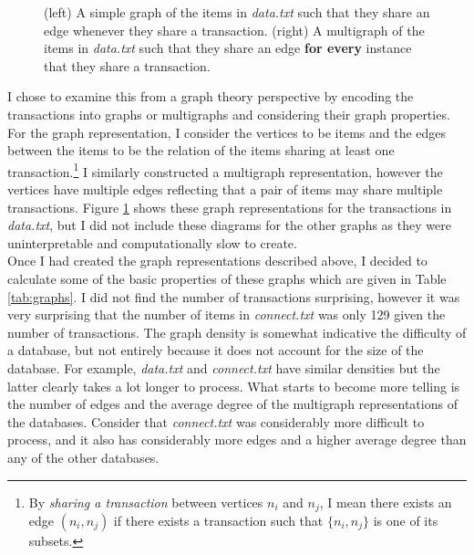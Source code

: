 \documentclass[12 pt]{article}
\begin{document}
\begin{figure}[H]
	\caption{(left) A simple graph of the items in \textit{data.txt} such that they share an edge whenever they share a transaction. (right) A multigraph of the items in \textit{data.txt} such that they share an edge \textbf{for every} instance that they share a transaction.}
	\label{fig:graphs}
\end{figure}

I chose to examine this from a graph theory perspective by encoding the transactions into graphs or multigraphs and considering their graph properties. For the graph representation, I consider the vertices to be items and the edges between the items to be the relation of the items sharing at least one transaction.\footnote{By \textit{sharing a transaction} between vertices $n_i$ and $n_j$, I mean there exists an edge $(n_i, n_j)$ if there exists a transaction such that $\lbrace n_i, n_j \rbrace$ is one of its subsets.} I similarly constructed a multigraph representation, however the vertices have multiple edges reflecting that a pair of items may share multiple transactions. Figure \ref{fig:graphs} shows these graph representations for the transactions in \textit{data.txt}, but I did not include these diagrams for the other graphs as they were uninterpretable and computationally slow to create.\\

Once I had created the graph representations described above, I decided to calculate some of the basic properties of these graphs which are given in Table \ref{tab:graphs}. I did not find the number of transactions surprising, however it was very surprising that the number of items in \textit{connect.txt} was only 129 given the number of transactions. The graph density is somewhat indicative the difficulty of a database, but not entirely because it does not account for the size of the database. For example, \textit{data.txt} and \textit{connect.txt} have similar densities but the latter clearly takes a lot longer to process. What starts to become more telling is the number of edges and the average degree of the multigraph representations of the databases. Consider that \textit{connect.txt} was considerably more difficult to process, and it also has considerably more edges and a higher average degree than any of the other databases.
\end{document}
